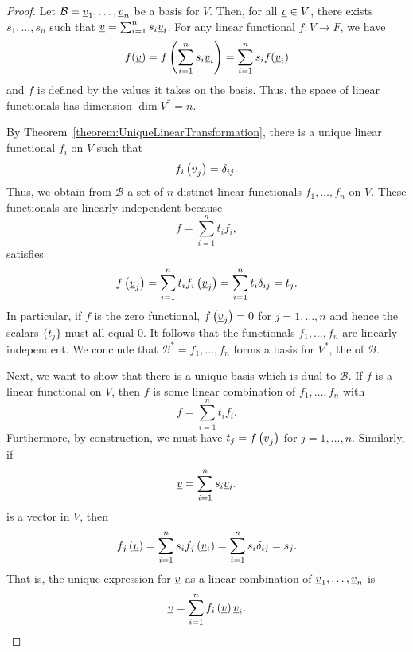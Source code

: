 \begin{proof}
Let $\mathcal{B} = \underline{v}_1, \ldots, \underline{v}_n$ be a basis for $V$.
Then, for all $\underline{v} \in V$, there exists $s_1,\ldots,s_n$ such that $\underline{v} = \sum_{i=1}^n s_i \underline{v}_i$.
For any linear functional $f\colon V \to F$, we have
\[ f(\underline{v}) = f\left( \sum_{i=1}^n s_i \underline{v}_i \right) = \sum_{i=1}^n s_i f(\underline{v}_i) \] 
and $f$ is defined by the values it takes on the basis.
Thus, the space of linear functionals has dimension $\dim V^* = n$.

By Theorem~\ref{theorem:UniqueLinearTransformation}, there is a unique linear functional $f_i$ on $V$ such that
\begin{equation*}
f_i \left( \underline{v}_j \right) = \delta_{ij} .
\end{equation*}
Thus, we obtain from $\mathcal{B}$ a set of $n$ distinct linear functionals $f_1, \ldots, f_n$ on $V$.
These functionals are linearly independent because
\begin{equation*}
f = \sum_{i=1}^n t_i f_i ,
\end{equation*}
satisfies
\begin{equation*}
f \left( \underline{v}_j \right) = \sum_{i=1}^n t_i f_i \left( \underline{v}_j \right)
= \sum_{i=1}^n t_i \delta_{ij} = t_j .
\end{equation*}
In particular, if $f$ is the zero functional, $f \left( \underline{v}_j \right) = 0$ for $j = 1, \ldots, n$ and hence the scalars $\{ t_j \}$ must all equal $0$.
It follows that the functionals $f_1, \ldots, f_n$ are linearly independent.
We conclude that $\mathcal{B}^* = f_1, \ldots, f_n$ forms a basis for $V^*$, the  of $\mathcal{B}$.

Next, we want to show that there is a unique basis which is dual to $\mathcal{B}$.
If $f$ is a linear functional on $V$, then $f$ is some linear combination of $f_1, \ldots, f_n$ with
\begin{equation*}
f = \sum_{i=1}^n t_i f_i .
\end{equation*}
Furthermore, by construction, we must have $t_j = f \left( \underline{v}_j \right)$ for $j = 1, \ldots, n$.
Similarly, if
\begin{equation*}
\underline{v} = \sum_{i=1}^n s_i \underline{v}_i .
\end{equation*}
is a vector in $V$, then
\begin{equation*}
f_j \left( \underline{v} \right) = \sum_{i=1}^n s_i f_j \left( \underline{v}_i \right)
= \sum_{i=1}^n s_i \delta_{ij} = s_j .
\end{equation*}
That is, the unique expression for $\underline{v}$ as a linear combination of $\underline{v}_1, \ldots, \underline{v}_n$ is
\begin{equation*}
\underline{v} = \sum_{i=1}^n f_i \left( \underline{v} \right) \underline{v}_i . \qedhere
\end{equation*}
\end{proof}


